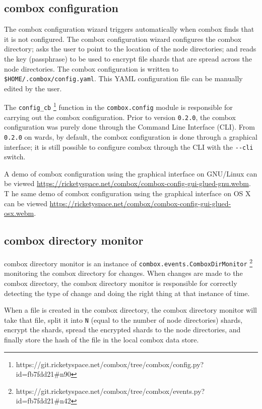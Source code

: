 \subsection{combox configuration}\label{sec:3-combox-config}

The combox configuration wizard triggers automatically when combox
finds that it is not configured. The combox configuration wizard
configures the combox directory; asks the user to point to the
location of the node directories; and reads the key (passphrase) to be
used to encrypt file shards that are spread across the node
directories. The combox configuration is written to
\verb+$HOME/.combox/config.yaml+. This YAML configuration file can be
manually edited by the user.

The \verb+config_cb+
\footnote{https://git.ricketyspace.net/combox/tree/combox/config.py?id=fb7fdd21\#n90}
function in the \verb+combox.config+ module is responsible for
carrying out the combox configuration. Prior to version \verb+0.2.0+,
the combox configuration was purely done through the Command Line
Interface (CLI). From \verb+0.2.0+ on wards, by default, the combox
configuration is done through a graphical interface; it is still
possible to configure combox through the CLI with the \verb+--cli+
switch.

A demo of combox configuration using the graphical interface on
GNU/Linux can be viewed
\url{https://ricketyspace.net/combox/combox-config-gui-glued-gnu.webm}.
T he same demo of combox configuration using the graphical interface
on OS X can be viewed
\url{https://ricketyspace.net/combox/combox-config-gui-glued-osx.webm}.

\subsection{combox directory monitor}\label{sec:3-combox-cdirm}

combox directory monitor is an instance of
\verb+combox.events.ComboxDirMonitor+
\footnote{https://git.ricketyspace.net/combox/tree/combox/events.py?id=fb7fdd21\#n42}
monitoring the combox directory for changes. When changes are made to
the combox directory, the combox directory monitor is responsible for
correctly detecting the type of change and doing the right thing at
that instance of time.

When a file is created in the combox directory, the combox directory
monitor will take that file, split it into \verb+N+ (equal to the
number of node directories) shards, encrypt the shards, spread the
encrypted shards to the node directories, and finally store the hash
of the file in the local combox data store.


